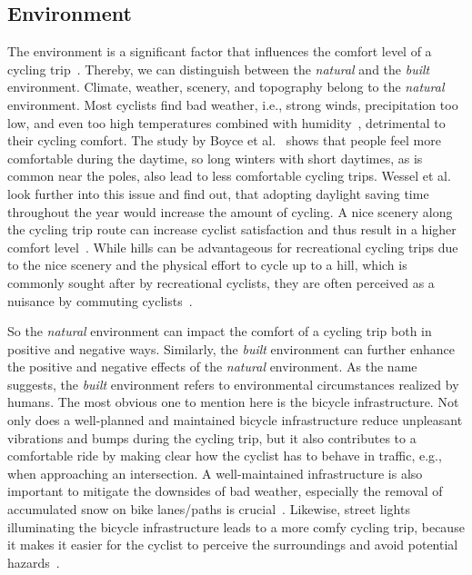 \subsection*{Environment}
The environment is a significant factor that influences the comfort level of a cycling trip~\cite{hull2014bicycle}.
Thereby, we can distinguish between the \textit{natural} and the \textit{built} environment.
Climate, weather, scenery, and topography belong to the \textit{natural} environment.
Most cyclists find bad weather, i.e., strong winds, precipitation too low, and even too high temperatures combined with humidity~\cite{nkurunziza2012examining}, detrimental to their cycling comfort.
The study by Boyce et al.~\cite{boyce2000perceptions} shows that people feel more comfortable during the daytime, so long winters with short daytimes, as is common near the poles, also lead to less comfortable cycling trips.
Wessel et al.~\cite{wessel2022cycling} look further into this issue and find out, that adopting daylight saving time throughout the year would increase the amount of cycling.
A nice scenery along the cycling trip route can increase cyclist satisfaction and thus result in a higher comfort level~\cite{wahlgren2012exploring,willis2013uniquely}.
While hills can be advantageous for recreational cycling trips due to the nice scenery and the physical effort to cycle up to a hill, which is commonly sought after by recreational cyclists, they are often perceived as a nuisance by commuting cyclists~\cite{lee2008neighbourhood}.

So the \textit{natural} environment can impact the comfort of a cycling trip both in positive and negative ways.
Similarly, the \textit{built} environment can further enhance the positive and negative effects of the \textit{natural} environment.
As the name suggests, the \textit{built} environment refers to environmental circumstances realized by humans.
The most obvious one to mention here is the bicycle infrastructure.
Not only does a well-planned and maintained bicycle infrastructure reduce unpleasant vibrations and bumps during the cycling trip, but it also contributes to a comfortable ride by making clear how the cyclist has to behave in traffic, e.g., when approaching an intersection.
A well-maintained infrastructure is also important to mitigate the downsides of bad weather, especially the removal of accumulated snow on bike lanes/paths is crucial~\cite{an2019weather,shoman2023evaluation}.
Likewise, street lights illuminating the bicycle infrastructure leads to a more comfy cycling trip, because it makes it easier for the cyclist to perceive the surroundings and avoid potential hazards~\cite{digioia2017safety}.

